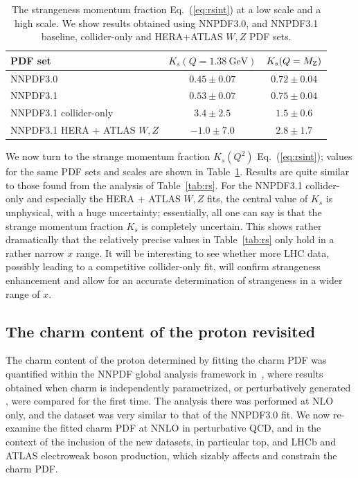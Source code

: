 \begin{table}[t]
  \begin{center}
        \renewcommand{\arraystretch}{1.2}
\begin{tabular}{|l|c|c|}
\hline
\centering PDF set &  $K_s(Q=1.38~\mathrm{GeV})$ & $K_s(Q=M_{\rm Z})$ \\
\hline
\hline
NNPDF3.0   &  $0.45 \pm 0.07$  & $0.72 \pm 0.04$ \\
NNPDF3.1    & $0.53 \pm 0.07$  &  $ 0.75 \pm 0.04 $  \\
NNPDF3.1 collider-only   & $3.4 \pm 2.5$  & $1.5 \pm 0.6$  \\
NNPDF3.1 HERA + ATLAS $W,Z$   & $-1.0 \pm 7.0$  & $2.8 \pm 1.7$ \\
\hline
\end{tabular}
\end{center}
\caption{\small \label{tab:rsint} 
  The strangeness momentum fraction Eq.~(\ref{eq:rsint}) 
  at a low scale and a high scale. We show results obtained using  
NNPDF3.0, and NNPDF3.1 baseline, collider-only and  HERA+ATLAS $W,Z$
PDF sets.}
\end{table}


We now turn to  the strange momentum fraction $K_s(Q^2)$
Eq.~(\ref{eq:rsint}); values for the same PDF sets and scales are
shown in Table~\ref{tab:rsint}. Results are quite similar to those
found from the analysis of  Table~\ref{tab:rs}.
For the NNPDF3.1 collider-only and especially the HERA + ATLAS $W,Z$ fits, the
central value of $K_s$ is  
unphysical, with a huge uncertainty; essentially, all one can say is
that the strange momentum fraction $K_s$ is completely uncertain. 
This shows rather dramatically that the relatively precise values 
in Table~\ref{tab:rs} only hold in a rather narrow $x$ range.
It will be interesting to see whether more LHC data, possibly leading
to a competitive collider-only fit,  will confirm
strangeness enhancement and allow for an accurate determination of
strangeness in a wider range of $x$.

\subsection{The charm content of the proton revisited}
\label{sec:phenocharm}

The charm content of the proton determined by fitting the charm PDF
was quantified within the
NNPDF global analysis framework in~\cite{Ball:2016neh}, where results
obtained when  charm is independently parametrized, or perturbatively
generated , were compared for the first time.
%
The analysis there was performed at NLO only, and the dataset was very similar to that
of the NNPDF3.0 fit.
%
We now re-examine the fitted charm PDF at NNLO in perturbative QCD, and in the 
context of the inclusion of the new datasets,
in particular top, and LHCb and ATLAS electroweak boson production,
which sizably affects and
constrain the charm PDF. 

